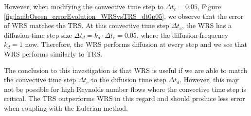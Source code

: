 However, when modifying the convective time step to $\Delta t_c=0.05$, Figure \ref{fig:lambOseen_errorEvolution_WRSvsTRS_dt0p05}, we observe that the error of WRS matches the TRS. At this convective time step $\Delta t_c$, the WRS has a diffusion time step size $\Delta t_d = k_d \cdot \Delta t_c = 0.05$, where the diffusion frequency $k_d = 1$ now. Therefore, the WRS performs diffusion at every step and we see that WRS performs similarly to TRS.

The conclusion to this investigation is that WRS is useful if we are able to match the convective time step $\Delta t_c$ to the diffusion time step $\Delta t_d$. However, this may not be possible for high Reynolds number flows where the convective time step is critical. The TRS outperforms WRS in this regard and should produce less error when coupling with the Eulerian method.

%

	
  


